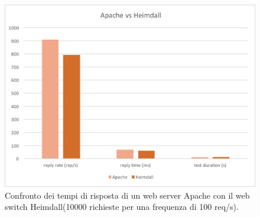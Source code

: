 \documentclass[italian]{tktltiki2}
\begin{document}
\begin{figure}[H]
\centering
\includegraphics[width=\textwidth]{images/apachevsheimdall}
\caption{Confronto dei tempi di risposta di un web server Apache con il web switch Heimdall(10000 richieste per una frequenza di 100 req/s).\label{fig: apachevsheimdall}}
\end{figure}
\end{document}
